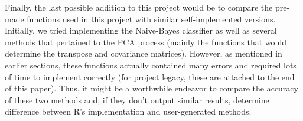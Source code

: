 \documentclass[twocolumn]{article}
\begin{document}
Finally, the last possible addition to this project would be to compare the pre-made functions used in this project with similar self-implemented versions. Initially, we tried implementing the Naive-Bayes classifier as well as several methods that pertained to the PCA process (mainly the functions that would determine the transpose and covariance matrices). However, as mentioned in earlier sections, these functions actually contained many errors and required lots of time to implement correctly (for project legacy, these are attached to the end of this paper). Thus, it might be a worthwhile endeavor to compare the accuracy of these two methods and, if they don't output similar results, determine difference between R's implementation and user-generated methods.




\end{document}
